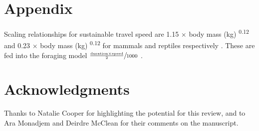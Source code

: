 \documentclass[a4paper,12pt]{article}
\begin{document}

\section*{Appendix}
Scaling relationships for sustainable travel speed are 1.15 $\times$ body mass (kg) \textsuperscript{0.12} and 0.23 $\times$ body mass (kg) \textsuperscript{0.12} for mammals and reptiles respectively \citep{ruxton2004obligate}.
These are fed into the foraging model $\sfrac{\frac{\text{duration} \times \text{speed}}{2}}{1000}$ \citep{Enstipp2006Energetics}.

\section*{Acknowledgments}
Thanks to Natalie Cooper for highlighting the potential for this review, and to Ara Monadjem and Deirdre McClean for their comments on the manuscript. 

\newpage



\end{document}
